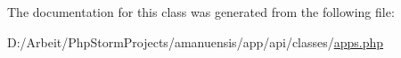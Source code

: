 The documentation for this class was generated from the following file\+:\begin{DoxyCompactItemize}
\item 
D\+:/\+Arbeit/\+Php\+Storm\+Projects/amanuensis/app/api/classes/\hyperlink{apps_8php}{apps.\+php}\end{DoxyCompactItemize}

